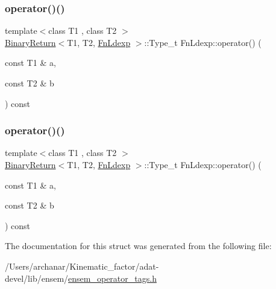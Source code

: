 \mbox{\label{structFnLdexp_af369e8f8d69893a25d9ea27c59ff4d02}} 
\subsubsection{\texorpdfstring{operator()()}{operator()()}\hspace{0.1cm}{\footnotesize\ttfamily [2/3]}}
{\footnotesize\ttfamily template$<$class T1 , class T2 $>$ \\
\mbox{\hyperlink{structBinaryReturn}{Binary\+Return}}$<$T1, T2, \mbox{\hyperlink{structFnLdexp}{Fn\+Ldexp}} $>$\+::Type\+\_\+t Fn\+Ldexp\+::operator() (\begin{DoxyParamCaption}\item[{const T1 \&}]{a,  }\item[{const T2 \&}]{b }\end{DoxyParamCaption}) const\hspace{0.3cm}{\ttfamily [inline]}}

\mbox{\label{structFnLdexp_af369e8f8d69893a25d9ea27c59ff4d02}} 
\subsubsection{\texorpdfstring{operator()()}{operator()()}\hspace{0.1cm}{\footnotesize\ttfamily [3/3]}}
{\footnotesize\ttfamily template$<$class T1 , class T2 $>$ \\
\mbox{\hyperlink{structBinaryReturn}{Binary\+Return}}$<$T1, T2, \mbox{\hyperlink{structFnLdexp}{Fn\+Ldexp}} $>$\+::Type\+\_\+t Fn\+Ldexp\+::operator() (\begin{DoxyParamCaption}\item[{const T1 \&}]{a,  }\item[{const T2 \&}]{b }\end{DoxyParamCaption}) const\hspace{0.3cm}{\ttfamily [inline]}}



The documentation for this struct was generated from the following file\+:\begin{DoxyCompactItemize}
\item 
/\+Users/archanar/\+Kinematic\+\_\+factor/adat-\/devel/lib/ensem/\mbox{\hyperlink{adat-devel_2lib_2ensem_2ensem__operator__tags_8h}{ensem\+\_\+operator\+\_\+tags.\+h}}\end{DoxyCompactItemize}
